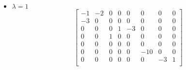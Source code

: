 \documentclass{report}
\begin{document}
\begin{itemize}
$$\begin{aligned}
-3x_1 + x_2 & = 0 \\
x_3+x_4-3x_5 & = 0 \\
x_3 + x_4 & = 0 \\
x_5 & = 0 \\
-9x_6 & = 0 \\
-2x_7 + x_8 & = 0 \\
-x_7 & = 0
\end{aligned}
\right.
$$
From the system of equations,  we find that $x_1 = x_2 = x_5 = x_6 = x_7 = x_8 = 0$. This means that we are left needing to find the values of $x_3$ and $x_4$.  From equation 4,  we can see that $x_3 = -x_4$.  If we say $x_4=a$,  where $a\in\mathbb{R}$,  then we have all the information we need to solve for the original eigenvector when $\lambda = 2$.  In particular,  we see that
$$
\begin{bmatrix}
0 \\ 0 \\ -a \\ a \\ 0 \\ 0 \\ 0 \\ 0
\end{bmatrix} =
a\begin{bmatrix}
0 \\ 0 \\ -1 \\ 1 \\ 0 \\ 0 \\ 0 \\ 0
\end{bmatrix} \implies
\vec{x} = \begin{bmatrix}
0 \\ 0 \\ -1 \\ 1 \\ 0 \\ 0 \\ 0 \\ 0
\end{bmatrix}
$$ 
\item $\lambda = 1$
$$
\begin{bmatrix}
-1&-2&0&0&0&0&0&0\\
-3&0&0&0&0&0&0&0\\
0&0&0&1&-3&0&0&0\\
0&0&1&0&0&0&0&0\\
0&0&0&0&0&0&0&0\\
0&0&0&0&0&-10&0&0\\
0&0&0&0&0&0&-3&1\\

\end{bmatrix}$$
\end{itemize}
\end{document}

